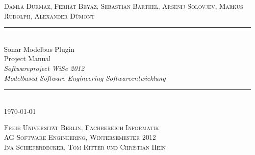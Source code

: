 \documentclass[book, 14pt]{memoir}
\begin{document}
\providecommand{\HUGE}{\Huge}
\newlength{\drop}
\newcommand*{\FSfont}[1]{\fontencoding{T1}\fontfamily{#1}\selectfont}
\newcommand*{\TXfont}[1]{\fontencoding{T1}\fontfamily{#1}\selectfont}
\makeatletter
\DeclareRobustCommand\ltseries
{\not@math@alphabet\ltseries\relax
\fontseries\ltdefault\selectfont}
\newcommand{\ltdefault}{l}
\DeclareRobustCommand\hbseries
{\not@math@alphabet\hbseries\relax
\fontseries\hbdefault\selectfont}
\newcommand{\hbdefault}{hb}


\begin{center}
\thispagestyle{empty}
\textheight
\settowidth{\unitlength}{\LARGE *************************************}
\vspace*{\baselineskip}\vspace*{\baselineskip}\vspace*{\baselineskip}
\vspace*{\baselineskip}\vspace*{\baselineskip}\vspace*{\baselineskip}
{\scshape Damla Durmaz, Ferhat Beyaz, Sebastian Barthel, Arsenij Solovjev, Markus Rudolph, Alexander Dümont}\\[\baselineskip]
\rule{\unitlength}{1.3pt}\\[\baselineskip]
{\LARGE Sonar Modelbus Plugin \\ Project Manual}\\[\baselineskip]
{\itshape Softwareproject WiSe 2012 \\ Modelbased Software Engineering Softwareentwicklung}\\[0.2\baselineskip]
\rule{\unitlength}{1.3pt}\\[\baselineskip]
{\large\scshape \today}\par
\vfill
{\small\scshape \textrm{Freie Universität Berlin, Fachbereich Informatik \\ AG Software Engineering, Wintersemester 2012} \\ Ina Schieferdecker, Tom Ritter und Christian Hein}
\par\vspace*{\drop}
\end{center}
\clearpage

%

%
%
% 
\end{document}
